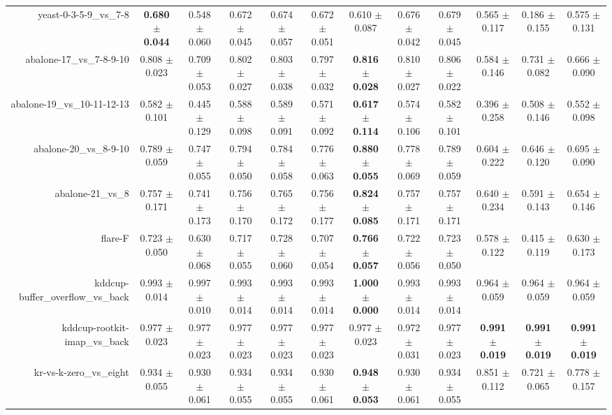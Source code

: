 \begin{table}[!ht]
{\begin{tabular}{r c c c c c c c c c c c}
yeast-0-3-5-9\_vs\_7-8 & \textbf{0.680 $\pm$ 0.044} & 0.548 $\pm$ 0.060 & 0.672 $\pm$ 0.045 & 0.674 $\pm$ 0.057 & 0.672 $\pm$ 0.051 & 0.610 $\pm$ 0.087 & 0.676 $\pm$ 0.042 & 0.679 $\pm$ 0.045 & 0.565 $\pm$ 0.117 & 0.186 $\pm$ 0.155 & 0.575 $\pm$ 0.131 \\
abalone-17\_vs\_7-8-9-10 & 0.808 $\pm$ 0.023 & 0.709 $\pm$ 0.053 & 0.802 $\pm$ 0.027 & 0.803 $\pm$ 0.038 & 0.797 $\pm$ 0.032 & \textbf{0.816 $\pm$ 0.028} & 0.810 $\pm$ 0.027 & 0.806 $\pm$ 0.022 & 0.584 $\pm$ 0.146 & 0.731 $\pm$ 0.082 & 0.666 $\pm$ 0.090 \\
abalone-19\_vs\_10-11-12-13 & 0.582 $\pm$ 0.101 & 0.445 $\pm$ 0.129 & 0.588 $\pm$ 0.098 & 0.589 $\pm$ 0.091 & 0.571 $\pm$ 0.092 & \textbf{0.617 $\pm$ 0.114} & 0.574 $\pm$ 0.106 & 0.582 $\pm$ 0.101 & 0.396 $\pm$ 0.258 & 0.508 $\pm$ 0.146 & 0.552 $\pm$ 0.098 \\
abalone-20\_vs\_8-9-10 & 0.789 $\pm$ 0.059 & 0.747 $\pm$ 0.055 & 0.794 $\pm$ 0.050 & 0.784 $\pm$ 0.058 & 0.776 $\pm$ 0.063 & \textbf{0.880 $\pm$ 0.055} & 0.778 $\pm$ 0.069 & 0.789 $\pm$ 0.059 & 0.604 $\pm$ 0.222 & 0.646 $\pm$ 0.120 & 0.695 $\pm$ 0.090 \\
abalone-21\_vs\_8 & 0.757 $\pm$ 0.171 & 0.741 $\pm$ 0.173 & 0.756 $\pm$ 0.170 & 0.765 $\pm$ 0.172 & 0.756 $\pm$ 0.177 & \textbf{0.824 $\pm$ 0.085} & 0.757 $\pm$ 0.171 & 0.757 $\pm$ 0.171 & 0.640 $\pm$ 0.234 & 0.591 $\pm$ 0.143 & 0.654 $\pm$ 0.146 \\
flare-F & 0.723 $\pm$ 0.050 & 0.630 $\pm$ 0.068 & 0.717 $\pm$ 0.055 & 0.728 $\pm$ 0.060 & 0.707 $\pm$ 0.054 & \textbf{0.766 $\pm$ 0.057} & 0.722 $\pm$ 0.056 & 0.723 $\pm$ 0.050 & 0.578 $\pm$ 0.122 & 0.415 $\pm$ 0.119 & 0.630 $\pm$ 0.173 \\
kddcup-buffer\_overflow\_vs\_back & 0.993 $\pm$ 0.014 & 0.997 $\pm$ 0.010 & 0.993 $\pm$ 0.014 & 0.993 $\pm$ 0.014 & 0.993 $\pm$ 0.014 & \textbf{1.000 $\pm$ 0.000} & 0.993 $\pm$ 0.014 & 0.993 $\pm$ 0.014 & 0.964 $\pm$ 0.059 & 0.964 $\pm$ 0.059 & 0.964 $\pm$ 0.059 \\
kddcup-rootkit-imap\_vs\_back & 0.977 $\pm$ 0.023 & 0.977 $\pm$ 0.023 & 0.977 $\pm$ 0.023 & 0.977 $\pm$ 0.023 & 0.977 $\pm$ 0.023 & 0.977 $\pm$ 0.023 & 0.972 $\pm$ 0.031 & 0.977 $\pm$ 0.023 & \textbf{0.991 $\pm$ 0.019} & \textbf{0.991 $\pm$ 0.019} & \textbf{0.991 $\pm$ 0.019} \\
kr-vs-k-zero\_vs\_eight & 0.934 $\pm$ 0.055 & 0.930 $\pm$ 0.061 & 0.934 $\pm$ 0.055 & 0.934 $\pm$ 0.055 & 0.930 $\pm$ 0.061 & \textbf{0.948 $\pm$ 0.053} & 0.930 $\pm$ 0.061 & 0.934 $\pm$ 0.055 & 0.851 $\pm$ 0.112 & 0.721 $\pm$ 0.065 & 0.778 $\pm$ 0.157 \\

\end{tabular}}
\end{table}
